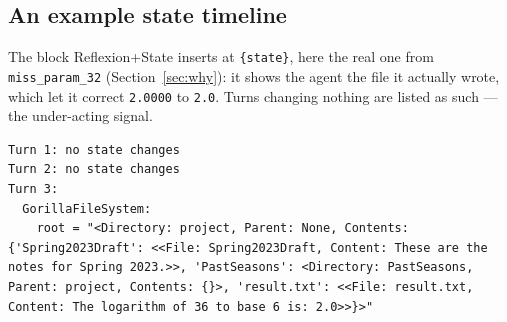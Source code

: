 \documentclass[a4paper, 12pt]{article}
\begin{document}
\subsection{An example state timeline}
\label{app:timeline}
The block Reflexion+State inserts at \texttt{\{state\}}, here the real one from
\texttt{miss\_param\_32} (Section~\ref{sec:why}): it shows the agent the file it
actually wrote, which let it correct \texttt{2.0000} to \texttt{2.0}. Turns
changing nothing are listed as such --- the under-acting signal.
\begin{lstlisting}
Turn 1: no state changes
Turn 2: no state changes
Turn 3:
  GorillaFileSystem:
    root = "<Directory: project, Parent: None, Contents: {'Spring2023Draft': <<File: Spring2023Draft, Content: These are the notes for Spring 2023.>>, 'PastSeasons': <Directory: PastSeasons, Parent: project, Contents: {}>, 'result.txt': <<File: result.txt, Content: The logarithm of 36 to base 6 is: 2.0>>}>"
\end{lstlisting}
\end{document}
